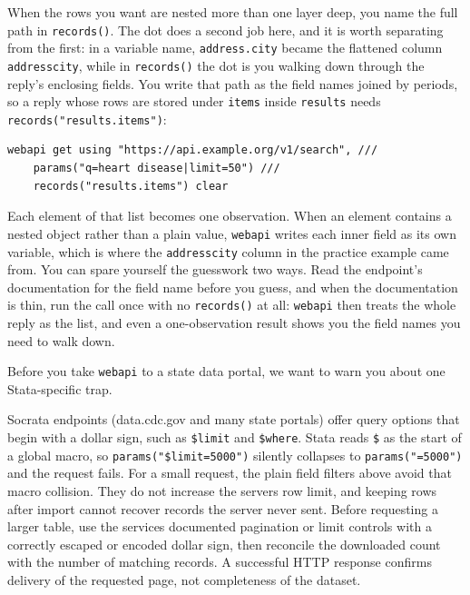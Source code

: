 \documentclass[
    a4paper,
    fontsize=10pt,
    twoside=true,
    numbers=noenddot,
]{kaobook}
\newenvironment{vizcallout}[1][Visualization to build]{%
    \begin{vizbox}[frametitle={#1}]%
}{%
    \end{vizbox}%
}
\begin{document}
When the rows you want are nested more than one layer deep, you name the full path in \texttt{records()}. The dot does a second job here, and it is worth separating from the first: in a variable name, \texttt{address.city} became the flattened column \texttt{addresscity}, while in \texttt{records()} the dot is you walking down through the reply's enclosing fields. You write that path as the field names joined by periods, so a reply whose rows are stored under \texttt{items} inside \texttt{results} needs \texttt{records("results.items")}:
\par
{\footnotesize
\begin{verbatim}
webapi get using "https://api.example.org/v1/search", ///
    params("q=heart disease|limit=50") ///
    records("results.items") clear
\end{verbatim}
}
Each element of that list becomes one observation. When an element contains a nested object rather than a plain value, \texttt{webapi} writes each inner field as its own variable, which is where the \texttt{addresscity} column in the practice example came from. You can spare yourself the guesswork two ways. Read the endpoint's documentation for the field name before you guess, and when the documentation is thin, run the call once with no \texttt{records()} at all: \texttt{webapi} then treats the whole reply as the list, and even a one-observation result shows you the field names you need to walk down.

Before you take \texttt{webapi} to a state data portal, we want to warn you about one Stata-specific trap.

\begin{vizcallout}[The one JSON trap in Stata: the \$ sign]
Socrata endpoints (data.cdc.gov and many state portals) offer query options that begin with a dollar sign, such as \texttt{\$limit} and \texttt{\$where}. Stata reads \texttt{\$} as the start of a global macro, so \texttt{params("\$limit=5000")} silently collapses to \texttt{params("=5000")} and the request fails. For a small request, the plain field filters above avoid that macro collision. They do not increase the server\textquotesingle s row limit, and keeping rows after import cannot recover records the server never sent. Before requesting a larger table, use the service\textquotesingle s documented pagination or limit controls with a correctly escaped or encoded dollar sign, then reconcile the downloaded count with the number of matching records. A successful HTTP response confirms delivery of the requested page, not completeness of the dataset.
\end{vizcallout}
\end{document}
